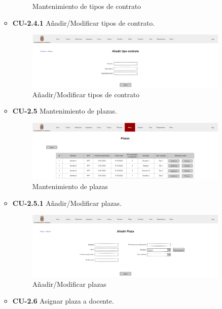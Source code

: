 \begin{itemize}
\begin{itemize}
\begin{figure}[!h]
		\caption{Mantenimiento de tipos de contrato}
		\end{figure}
		\FloatBarrier
\newpage
		\item \textbf{CU-2.4.1} Añadir/Modificar tipos de contrato.
		\begin{figure}[!h]
		\centering
		\includegraphics[width=\textwidth]{../img/Anexos/Vistas/add_contrato.png}
		\caption{Añadir/Modificar tipos de contrato}
		\end{figure}
		\FloatBarrier
		\item \textbf{CU-2.5} Mantenimiento de plazas.
		\begin{figure}[!h]
		\centering
		\includegraphics[width=\textwidth]{../img/Anexos/Vistas/plazas.png}
		\caption{Mantenimiento de plazas}
		\end{figure}
		\FloatBarrier
\newpage
		\item \textbf{CU-2.5.1} Añadir/Modificar plazas.
		\begin{figure}[!h]
		\centering
		\includegraphics[width=\textwidth]{../img/Anexos/Vistas/add_plaza.png}
		\caption{Añadir/Modificar plazas}
		\end{figure}
		\FloatBarrier
		\item \textbf{CU-2.6} Asignar plaza a docente.
		\begin{figure}[!h]

\end{figure}
\end{itemize}
\end{itemize}
